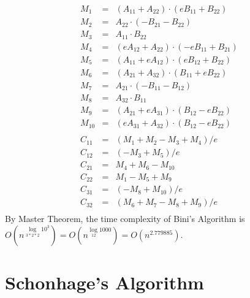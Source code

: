 \documentclass{article}
\begin{document}
\begin{eqnarray*}
M_1 &=& (A_{11} + A_{22}) \cdot (eB_{11} + B_{22}) \\
M_2 &=& A_{22}\cdot  (-B_{21} - B_{22}) \\
M_3 &=& A_{11}\cdot B_{22} \\
M_4 &=& (eA_{12} + A_{22})\cdot (-eB_{11} + B_{21}) \\
M_5 &=& (A_{11} + eA_{12}) \cdot (eB_{12} + B_{22}) \\
M_6 &=& (A_{21} + A_{32}) \cdot (B_{11} + eB_{22}) \\
M_7 &=& A_{21} \cdot (-B_{11} - B_{12}) \\
M_8 &=& A_{32} \cdot B_{11}\\
M_9 &=& (A_{21} + eA_{31}) \cdot (B_{12} - eB_{22})\\
M_{10} &=& (eA_{31} + A_{32}) \cdot (B_{12} - eB_{22})\\\\
C_{11} &=& (M_1 + M_2 - M_3 + M_4)/e \\
C_{12} &=& (-M_3 + M_5)/e \\
C_{21} &=& M_4 + M_6 - M_{10}\\
C_{22} &=& M_1 - M_5 + M_9\\
C_{31} &=& (-M_8 + M_{10})/e \\
C_{32} &=& (M_6 + M_7 - M_8 + M_9)/e\\
\end{eqnarray*}
By Master Theorem, the time complexity of Bini's Algorithm is $O(n^{\log\limits_{3*2*2}10^3}) = O(n^{\log\limits_{12}1000}) = O(n^{2.779885})$.
\section{Schonhage's Algorithm \cite{Schonhage81}}
\end{document}
